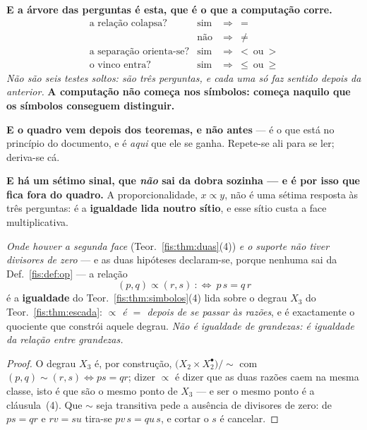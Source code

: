 \documentclass[livro.tex]{subfiles}
\begin{document}
\medskip\noindent\textbf{E a árvore das perguntas é esta, que é o que a
computação corre.}
\[
\begin{array}{rcl}
\text{a relação colapsa?} & \text{sim} & \Longrightarrow\ =\\[2pt]
 & \text{não} & \Longrightarrow\ \neq\\[4pt]
\text{a separação orienta-se?} & \text{sim} & \Longrightarrow\ <\ \text{ou}\ >\\[4pt]
\text{o vinco entra?} & \text{sim} & \Longrightarrow\ \le\ \text{ou}\ \ge
\end{array}
\]
\emph{Não são seis testes soltos: são três perguntas, e cada uma só faz sentido
depois da anterior.} \textbf{A computação não começa nos símbolos: começa naquilo
que os símbolos conseguem distinguir.}

\medskip\noindent\textbf{E o quadro vem depois dos teoremas, e não antes} --- é o
que está no princípio do documento, e é \emph{aqui} que ele se ganha. Repete-se
ali para se ler; deriva-se cá.

\medskip\noindent\textbf{E há um sétimo sinal, que \emph{não} sai da dobra
sozinha --- e é por isso que fica fora do quadro.} A proporcionalidade,
$x\propto y$, não é uma sétima resposta às três perguntas: é a \textbf{igualdade
lida noutro sítio}, e esse sítio custa a face multiplicativa.

\begin{corolario}\label{fis:cor:prop}
\emph{Onde houver a segunda face} (Teor.~\ref{fis:thm:duas}(4)) \emph{e o suporte
não tiver divisores de zero} --- e as duas hipóteses declaram-se, porque nenhuma
sai da Def.~\ref{fis:def:op} --- a relação
\[
\boxed{\;(p,q)\propto(r,s)\ :\Longleftrightarrow\ p\,s=q\,r\;}
\]
é a \textbf{igualdade} do Teor.~\ref{fis:thm:simbolos}(4) lida sobre o degrau
$X_3$ do Teor.~\ref{fis:thm:escada}: \emph{$\propto$ é $=$ depois de se passar às
razões}, e é exactamente o quociente que constrói aquele degrau.
\emph{Não é igualdade de grandezas: é igualdade da relação entre grandezas.}
\end{corolario}

\begin{proof}
O degrau $X_3$ é, por construção, $\bigl(X_2\times X_2^{\bullet}\bigr)/{\sim}$
com $(p,q)\sim(r,s)\iff ps=qr$; dizer $\propto$ é dizer que as duas razões caem
na mesma classe, isto é que são o mesmo ponto de $X_3$ --- e ser o mesmo ponto é
a cláusula~(4). Que $\sim$ seja transitiva pede a ausência de divisores de zero:
de $ps=qr$ e $rv=su$ tira-se $pv\,s=qu\,s$, e cortar o $s$ é cancelar.
\end{proof}
\end{document}
